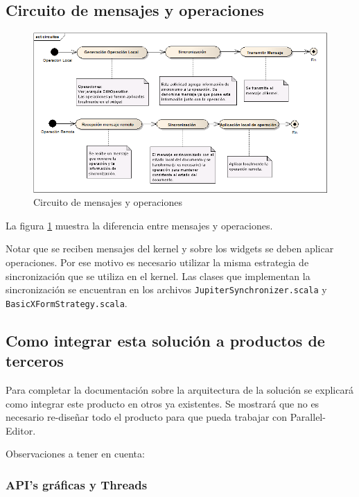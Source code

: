 \documentclass[12pt,a4paper]{article}
\begin{document}
\subsection{Circuito de mensajes y operaciones}

	\begin{figure}[!ht]
		\begin{center}
			\includegraphics[width=14cm]{circuitos-mensajes.png}
			\caption{\label{circuitos-mensajes} Circuito de mensajes y operaciones }
		\end{center}
	\end{figure}


La figura \ref{circuitos-mensajes} muestra la diferencia entre mensajes y operaciones.

Notar que se reciben mensajes del kernel y sobre los widgets se deben aplicar operaciones. Por ese motivo es necesario 
utilizar la misma estrategia de sincronización que se utiliza en el kernel. Las clases que implementan la sincronización se 
encuentran en los archivos 
\texttt{JupiterSynchronizer.scala}
y \texttt{BasicXFormStrategy.scala}.
\subsection{Como integrar esta solución a productos de terceros}
Para completar la documentación sobre la arquitectura de la solución se explicará como integrar este producto en otros ya
existentes. Se mostrará que no es necesario re-diseñar todo el producto para que pueda trabajar con Parallel-Editor.

Observaciones a tener en cuenta:

\subsubsection{API’s gráficas y Threads}
\end{document}
